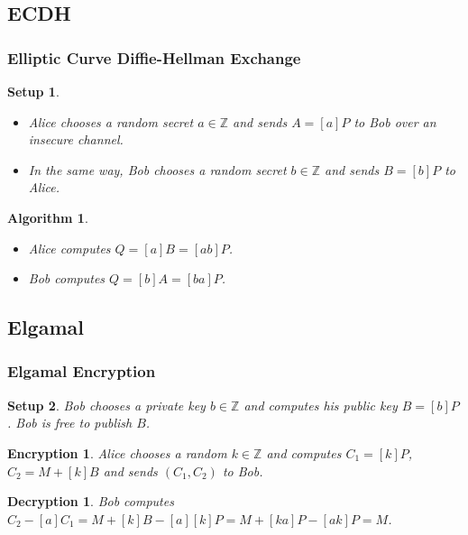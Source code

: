 \documentclass{beamer}
\newtheorem{algorithm}{Algorithm}
\newtheorem{setup}{Setup}
\newtheorem{encryption}{Encryption}
\newtheorem{decryption}{Decryption}
\begin{document}
    \subsection{ECDH}
    \begin{frame}
        \frametitle{Elliptic Curve Diffie-Hellman Exchange}
        \begin{setup}
            \begin{itemize}
                \item Alice chooses a random secret \(a \in \mathbb{Z}\) and
                    sends \(A = [a]P\) to Bob over an insecure channel.
                \item In the same way, Bob chooses a random secret
                \(b \in \mathbb{Z}\) and sends \(B = [b]P\) to Alice.
            \end{itemize}
        \end{setup}
        \vfill
        \begin{algorithm}
            \begin{itemize}
                \item Alice computes \(Q = [a]B = [ab]P\).
                \item Bob computes \(Q = [b]A = [ba]P\).
            \end{itemize}
        \end{algorithm}
    \end{frame}

    \subsection{Elgamal}
    \begin{frame}
        \frametitle{Elgamal Encryption}
        \begin{setup}
            Bob chooses a private key \(b \in \mathbb{Z}\) and computes
            his public key \(B = [b]P\). Bob is free to publish \(B\).
        \end{setup}
        \vfill
        \begin{encryption}
            Alice chooses a random \(k \in \mathbb{Z}\)
            and computes \(C_1 = [k]P\),
            \(C_2 = M + [k]B\) and sends \((C_1, C_2)\) to Bob.
        \end{encryption}
        \vfill
        \begin{decryption}
            Bob computes \(C_2 - [a]C_1 = M + [k]B - [a][k]P = 
            M + [ka]P - [ak]P = M\).
        \end{decryption}
    \end{frame}
\end{document}
